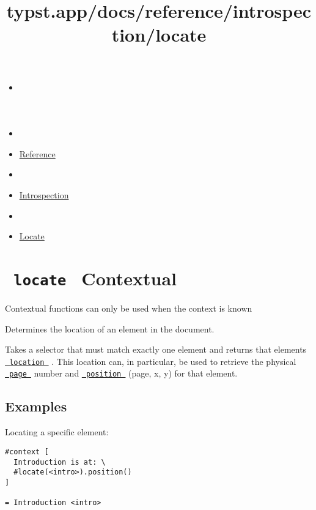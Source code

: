 \title{typst.app/docs/reference/introspection/locate}

\begin{itemize}
\tightlist
\item
  \href{/docs}{}
\item
  
\item
  \href{/docs/reference/}{Reference}
\item
  
\item
  \href{/docs/reference/introspection/}{Introspection}
\item
  
\item
  \href{/docs/reference/introspection/locate/}{Locate}
\end{itemize}

\section{\texorpdfstring{\texttt{\ locate\ } {{ Contextual
}}}{ locate   Contextual }}\label{summary}

\label{contextual-tooltip}
Contextual functions can only be used when the context is known

Determines the location of an element in the document.

Takes a selector that must match exactly one element and returns that
element\textquotesingle s
\href{/docs/reference/introspection/location/}{\texttt{\ location\ }} .
This location can, in particular, be used to retrieve the physical
\href{/docs/reference/introspection/location/\#definitions-page}{\texttt{\ page\ }}
number and
\href{/docs/reference/introspection/location/\#definitions-position}{\texttt{\ position\ }}
(page, x, y) for that element.

\subsection{Examples}\label{examples}

Locating a specific element:

\begin{verbatim}
#context [
  Introduction is at: \
  #locate(<intro>).position()
]

= Introduction <intro>
\end{verbatim}

